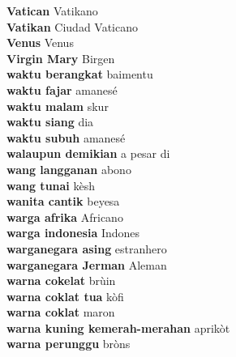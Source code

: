 \textbf{ Vatican  } Vatikano \\
\textbf{ Vatikan  } Ciudad Vaticano \\
\textbf{ Venus  } Venus \\
\textbf{ Virgin Mary  } Birgen \\
\textbf{ waktu berangkat  } baimentu \\
\textbf{ waktu fajar  } amanesé \\
\textbf{ waktu malam  } skur \\
\textbf{ waktu siang  } dia \\
\textbf{ waktu subuh  } amanesé \\
\textbf{ walaupun demikian  } a pesar di \\
\textbf{ wang langganan  } abono \\
\textbf{ wang tunai  } kèsh \\
\textbf{ wanita cantik  } beyesa \\
\textbf{ warga afrika  } Africano \\
\textbf{ warga indonesia  } Indones \\
\textbf{ warganegara asing  } estranhero \\
\textbf{ warganegara Jerman  } Aleman \\
\textbf{ warna cokelat  } brùin \\
\textbf{ warna coklat tua  } kòfi \\
\textbf{ warna coklat  } maron \\
\textbf{ warna kuning kemerah-merahan  } aprikòt \\
\textbf{ warna perunggu  } bròns \\
